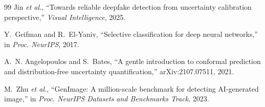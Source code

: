 \documentclass[11pt,a4paper]{article}
\begin{document}
\begin{thebibliography}{99}
Jin \emph{et al.}, ``Towards reliable deepfake detection from uncertainty calibration
perspective,'' \emph{Visual Intelligence}, 2025.

Y.~Geifman and R.~El-Yaniv, ``Selective classification for deep neural networks,'' in
\emph{Proc. NeurIPS}, 2017.

A.~N. Angelopoulos and S.~Bates, ``A gentle introduction to conformal prediction and
distribution-free uncertainty quantification,'' arXiv:2107.07511, 2021.

M.~Zhu \emph{et al.}, ``GenImage: A million-scale benchmark for detecting AI-generated image,'' in
\emph{Proc. NeurIPS Datasets and Benchmarks Track}, 2023.

\end{thebibliography}
\end{document}
